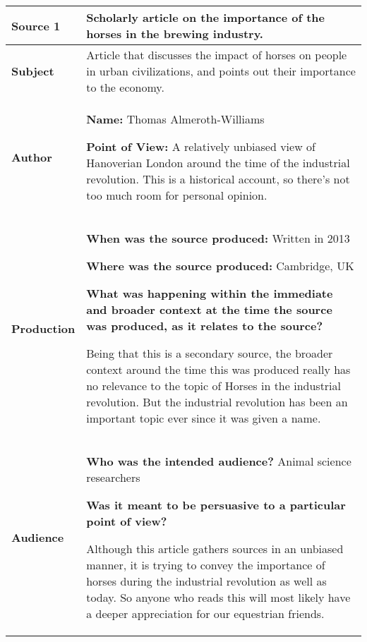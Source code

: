 {\renewcommand{\arraystretch}{2}
\begin{longtable}{ | p{3cm} | p{13cm} | }
\hline

\textbf{Source 1} &
Scholarly article on the importance of the horses in the brewing industry.
\\\hline

\textbf{Subject} &
Article that discusses the impact of horses on people in urban civilizations, and points out their importance to the economy.
\\\hline

\textbf{Author} &
\textbf{Name:} Thomas Almeroth-Williams \n

\textbf{Point of View:} A relatively unbiased view of Hanoverian London around the time of the industrial revolution.  This is a historical account, so there's not too much room for personal opinion.
\\\hline

\textbf{Production} &
\textbf{When was the source produced:} Written in 2013

\textbf{Where was the source produced:} Cambridge, UK \n

\textbf{What was happening within the immediate and broader context at the time the source was produced, as it relates to the source? } \n

Being that this is a secondary source, the broader context around the time this was produced really has no relevance to the topic of Horses in the industrial revolution.  But the industrial revolution has been an important topic ever since it was given a name.
\\\hline

\textbf{Audience} &
\textbf{Who was the intended audience?} Animal science researchers \n 

\textbf{Was it meant to be persuasive to a particular point of view? } \n

Although this article gathers sources in an unbiased manner, it is trying to convey the importance of horses during the industrial revolution as well as today.  So anyone who reads this will most likely have a deeper appreciation for our equestrian friends.
\\\hline
\end{longtable}}